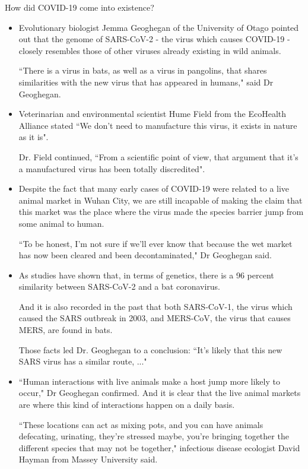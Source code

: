     \par How did COVID-19 come into existence? \parencite{CoronavirusOrigin}
      \begin{itemize}
        \item Evolutionary biologist Jemma Geoghegan of the University of Otago pointed out that the genome of SARS-CoV-2 - the virus which causes COVID-19 - closely resembles those of other viruses already existing in wild animals.
        \par ``There is a virus in bats, as well as a virus in pangolins, that shares similarities with the new virus that has appeared in humans," said Dr Geoghegan.
        \item Veterinarian and environmental scientist Hume Field from the EcoHealth Alliance stated ``We don't need to manufacture this virus, it exists in nature as it is".
        \par Dr. Field continued, ``From a scientific point of view, that argument that it's a manufactured virus has been totally discredited".
        \item Despite the fact that many early cases of COVID-19 were related to a live animal market in Wuhan City, we are still incapable of making the claim that this market was the place where the virus made the species barrier jump from some animal to human.
        \par ``To be honest, I'm not sure if we'll ever know that because the wet market has now been cleared and been decontaminated," Dr Geoghegan said.
        \item As studies have shown that, in terms of genetics, there is a 96 percent similarity between SARS-CoV-2 and a bat coronavirus.
        \par And it is also recorded in the past that both SARS-CoV-1, the virus which caused the SARS outbreak in 2003, and MERS‐CoV, the virus that causes MERS, are found in bats.
        \par Those facts led Dr. Geoghegan to a conclusion: ``It's likely that this new SARS virus has a similar route, ..."
        \item ``Human interactions with live animals make a host jump more likely to occur," Dr Geoghegan confirmed. And it is clear that the live animal markets are where this kind of interactions happen on a daily basis.
        \par ``These locations can act as mixing pots, and you can have animals defecating, urinating, they're stressed maybe, you're bringing together the different species that may not be together," infectious disease ecologist David Hayman from Massey University said.

\end{itemize}
